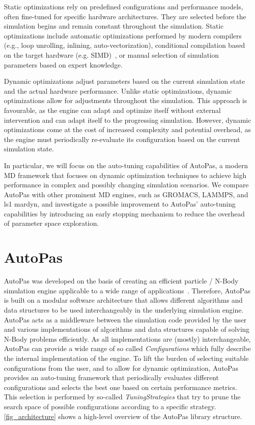 \documentclass[conference]{IEEEtran}
\begin{document}
Static optimizations rely on predefined configurations and performance models, often fine-tuned for specific hardware architectures. They are selected before the simulation begins and remain constant throughout the simulation. Static optimizations include automatic optimizations performed by modern compilers (e.g., loop unrolling, inlining, auto-vectorization), conditional compilation based on the target hardware (e.g. SIMD)~\cite{Gratl2019AutoPas}, or manual selection of simulation parameters based on expert knowledge.

Dynamic optimizations adjust parameters based on the current simulation state and the actual hardware performance. Unlike static optimizations, dynamic optimizations allow for adjustments throughout the simulation. This approach is favourable, as the engine can adapt and optimize itself without external intervention and can adapt itself to the progressing simulation. However, dynamic optimizations come at the cost of increased complexity and potential overhead, as the engine must periodically re-evaluate its configuration based on the current simulation state.

In particular, we will focus on the auto-tuning capabilities of AutoPas, a modern MD framework that focuses on dynamic optimization techniques to achieve high performance in complex and possibly changing simulation scenarios. We compare AutoPas with other prominent MD engines, such as GROMACS, LAMMPS, and ls1 mardyn, and investigate a possible improvement to AutoPas' auto-tuning capabilities by introducing an early stopping mechanism to reduce the overhead of parameter space exploration.


\section{AutoPas}

AutoPas was developed on the basis of creating an efficient particle / N-Body simulation engine applicable to a wide range of applications~\cite{Tchipev2020}. Therefore, AutoPas is built on a modular software architecture that allows different algorithms and data structures to be used interchangeably in the underlying simulation engine. AutoPas acts as a middleware between the simulation code provided by the user and various implementations of algorithms and data structures capable of solving N-Body problems efficiently. As all implementations are (mostly) interchangeable, AutoPas can provide a wide range of so called \textit{Configurations} which fully describe the internal implementation of the engine.
To lift the burden of selecting suitable configurations from the user, and to allow for dynamic optimization, AutoPas provides an auto-tuning framework that periodically evaluates different configurations and selects the best one based on certain performance metrics. This selection is performed by so-called \textit{TuningStrategies} that try to prune the search space of possible configurations according to a specific strategy. \autoref{fig_architecture} shows a high-level overview of the AutoPas library structure.
\end{document}
